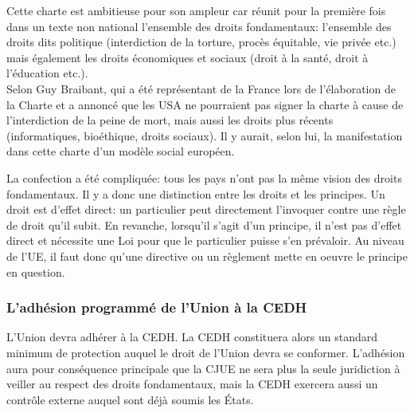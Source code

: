 \documentclass[12pt, a4paper, openany]{book}
\begin{document}
Cette charte est ambitieuse pour son ampleur car réunit pour la première fois dans un texte non national l'ensemble des droits fondamentaux: l'ensemble des droits dits politique (interdiction de la torture, procès équitable, vie privée etc.) mais également les droits économiques et sociaux (droit à la santé, droit à l'éducation etc.). \\
Selon Guy Braibant, qui a été représentant de la France lors de l'élaboration de la Charte et a annoncé que les USA ne pourraient pas signer la charte à cause de l'interdiction de la peine de mort, mais aussi les droits plus récents (informatiques, bioéthique, droits sociaux). Il y aurait, selon lui, la manifestation dans cette charte d'un modèle social européen.


La confection a été compliquée: tous les pays n'ont pas la même vision des droits fondamentaux. Il y a donc une distinction entre les droits et les principes. Un droit est d'effet direct: un particulier peut directement l'invoquer contre une règle de droit qu'il subit. En revanche, lorsqu'il s'agit d'un principe, il n'est pas d'effet direct et nécessite une Loi pour que le particulier puisse s'en prévaloir. Au niveau de l'UE, il faut donc qu'une directive ou un règlement mette en oeuvre le principe en question. 

\subsubsection{L'adhésion programmé de l'Union à la CEDH}

L'Union devra adhérer à la CEDH. La CEDH constituera alors un standard minimum de protection auquel le droit de l'Union devra se conformer. L'adhésion aura pour conséquence principale que la CJUE ne sera plus la seule juridiction à veiller au respect des droits fondamentaux, mais la CEDH exercera aussi un contrôle externe auquel sont déjà soumis les États.
\end{document}
